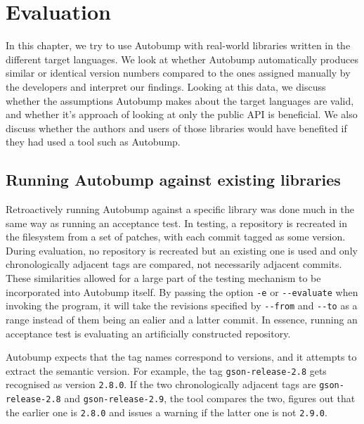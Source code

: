 \documentclass{l4proj}
\newcommand\genericstyle{\lstset{basicstyle=\ttm}}
\newcommand\codeinline[1]{{\genericstyle\lstinline!#1!}}
\begin{document}
\chapter{Evaluation}
\label{Evaluation}

In this chapter, we try to use Autobump with real-world libraries
written in the different target languages. We look at whether Autobump
automatically produces similar or identical version numbers compared
to the ones assigned manually by the developers and interpret our findings.
Looking at this data, we discuss whether the assumptions Autobump
makes about the target languages are valid, and whether it's approach
of looking at only the public API is beneficial. We also discuss
whether the authors and users of those libraries would have benefited
if they had used a tool such as Autobump.

\section{Running Autobump against existing libraries}

Retroactively running Autobump against a specific library was done
much in the same way as running an acceptance test. In testing, a
repository is recreated in the filesystem from a set of patches, with
each commit tagged as some version. During evaluation, no repository
is recreated but an existing one is used and only chronologically
adjacent tags are compared, not necessarily adjacent commits. These
similarities allowed for a large part of the testing mechanism to be
incorporated into Autobump itself. By passing the option
\codeinline{-e} or \codeinline{--evaluate} when invoking the program,
it will take the revisions specified by \codeinline{--from} and
\codeinline{--to} as a range instead of them being an ealier and a
latter commit. In essence, running an acceptance test is evaluating an
artificially constructed repository.

Autobump expects that the tag names correspond to versions, and it
attempts to extract the semantic version. For example, the tag
\codeinline{gson-release-2.8} gets recognised as version
\codeinline{2.8.0}. If the two chronologically adjacent tags are
\codeinline{gson-release-2.8} and \codeinline{gson-release-2.9}, the
tool compares the two, figures out that the earlier one is
\codeinline{2.8.0} and issues a warning if the latter one is not
\codeinline{2.9.0}.
\end{document}
